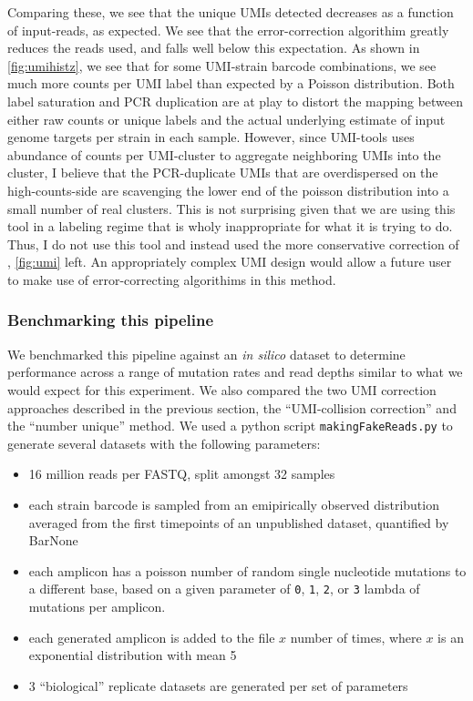 Comparing these, we see that the unique UMIs detected decreases as a
function of input-reads, as expected. 
We see that the error-correction algorithim greatly reduces the reads
used, and falls well below this expectation. As shown in
\autoref{fig:umihistz}, we see that for some UMI-strain barcode
combinations, we see much more counts per UMI label than expected by a
Poisson distribution. 
Both label saturation and PCR duplication
are at play to distort the mapping between either raw counts or unique
labels and the actual underlying estimate of input genome targets per
strain in each sample.
However, since UMI-tools uses abundance of counts per UMI-cluster
to aggregate neighboring UMIs into the cluster, I believe that the
PCR-duplicate UMIs that are overdispersed on the high-counts-side
are scavenging the lower end of the poisson distribution 
into a small number of real clusters. This is not
surprising given that we are using this tool in a labeling regime that
is wholy inappropriate for what it is trying to do. 
Thus, I do not use
this tool and instead used the more conservative 
correction of \cite{fu2011counting}, \autoref{fig:umi} left.
An appropriately complex UMI design would allow a future user to make
use of error-correcting algorithims in this method.

\subsubsection{Benchmarking this pipeline}

We benchmarked this pipeline against an \emph{in silico} dataset to
determine performance across a range of mutation rates and read depths
similar to what we would expect for this experiment. We also compared
the two UMI correction approaches described in the previous section, the
``UMI-collision correction'' and the ``number unique'' method. We used a
python script \texttt{makingFakeReads.py} to generate several datasets
with the following parameters:

\begin{itemize}
  \setlength\itemsep{0em}
  \item
  16 million reads per FASTQ, split amongst 32 samples
  \item
  each strain barcode is sampled from an emipirically observed
  distribution averaged from the first timepoints of an unpublished
  dataset, quantified by BarNone
  \item
  each amplicon has a poisson number of random single nucleotide
  mutations to a different base, based on a given parameter of
  \texttt{0}, \texttt{1}, \texttt{2}, or \texttt{3} lambda of mutations
  per amplicon.
  \item
  each generated amplicon is added to the file \(x\) number of times,
  where \(x\) is an exponential distribution with mean 5
  \item
  3 ``biological'' replicate datasets are generated per set of
  parameters
\end{itemize}

